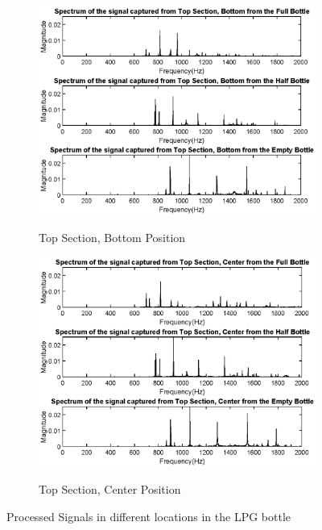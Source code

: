 \begin{figure}[]
    \begin{subfigure}{0.45\textwidth}
        \centering
        \includegraphics[width=\linewidth]{Chapters/6CHP/Figures/TopBot.eps}
        \caption{Top Section, Bottom Position}{}
        \label{subfig:TopBotMic}
    \end{subfigure}
    \begin{subfigure}{0.45\textwidth}
        \centering
        \includegraphics[width=\linewidth]{Chapters/6CHP/Figures/TopCenter.eps}
        \caption{Top Section, Center Position}{}
        \label{subfig:TopCenMic}
    \end{subfigure}
    \caption{Processed Signals in different locations in the LPG bottle}{}
     \label{fig:ProcRealDataMic}
\end{figure}

